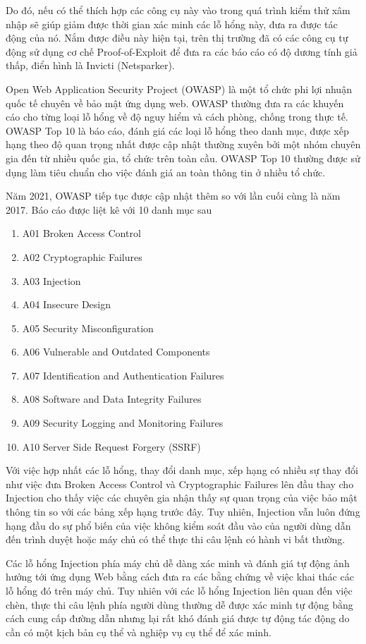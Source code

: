 \documentclass[./../main.tex]{subfiles}
\begin{document}
Do đó, nếu có thể thích hợp các công cụ này vào trong quá trình kiểm thử xâm nhập sẽ giúp giảm được thời gian xác minh các lỗ hổng này, đưa ra được tác động của nó. Nắm được điều này hiện tại, trên thị trường đã có các công cụ tự động sử dụng cơ chế Proof-of-Exploit để đưa ra các báo cáo có độ dương tính giả thấp, điển hình là Invicti (Netsparker).

Open Web Application Security Project (OWASP) là một tổ chức phi lợi nhuận quốc tế chuyên về bảo mật ứng dụng web. OWASP thường đưa ra các khuyến cáo cho từng loại lỗ hổng về độ nguy hiểm và cách phòng, chống trong thực tế. OWASP Top 10 là báo cáo, đánh giá các loại lỗ hổng theo danh mục, được xếp hạng theo độ quan trọng nhất được cập nhật thường xuyên bởi một nhóm chuyên gia đến từ nhiều quốc gia, tổ chức trên toàn cầu. OWASP Top 10 thường được sử dụng làm tiêu chuẩn cho việc đánh giá an toàn thông tin ở nhiều tổ chức.

Năm 2021, OWASP tiếp tục được cập nhật thêm so với lần cuối cùng là năm 2017. Báo cáo được liệt kê với 10 danh mục sau
\begin{enumerate}
	\item A01 Broken Access Control
	\item A02 Cryptographic Failures
	\item A03 Injection
	\item A04 Insecure Design
	\item A05 Security Misconfiguration
	\item A06 Vulnerable and Outdated Components
	\item A07 Identification and Authentication Failures
	\item A08 Software and Data Integrity Failures
	\item A09 Security Logging and Monitoring Failures
	\item A10 Server Side Request Forgery (SSRF)
\end{enumerate}
Với việc hợp nhất các lỗ hổng, thay đổi danh mục, xếp hạng có nhiều sự thay đổi như việc đưa Broken Access Control và Cryptographic Failures lên đầu thay cho Injection cho thấy việc các chuyên gia nhận thấy sự quan trọng của việc bảo mật thông tin so với các bảng xếp hạng trước đây. Tuy nhiên, Injection vẫn luôn đứng hạng đầu do sự phổ biến của việc không kiểm soát đầu vào của người dùng dẫn đến trình duyệt hoặc máy chủ có thể thực thi câu lệnh có hành vi bất thường.

Các lỗ hổng Injection phía máy chủ dễ dàng xác minh và đánh giá tự động ảnh hưởng tới ứng dụng Web bằng cách đưa ra các bằng chứng về việc khai thác các lỗ hổng đó trên máy chủ. Tuy nhiên với các lỗ hổng Injection liên quan đến việc chèn, thực thi câu lệnh phía người dùng thường dễ được xác minh tự động bằng cách cung cấp đường dẫn nhưng lại rất khó đánh giá được tự động tác động do cần có một kịch bản cụ thể và nghiệp vụ cụ thể để xác minh.
\end{document}

